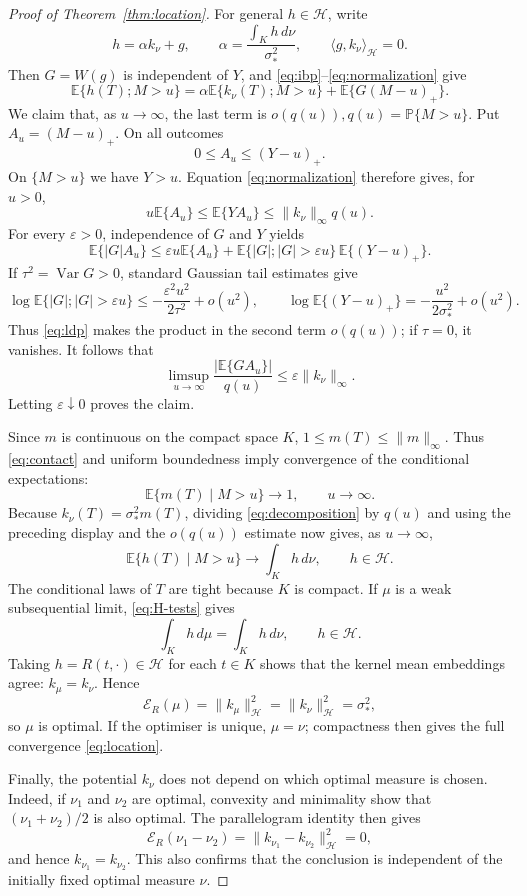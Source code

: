 \documentclass[11pt]{amsart}
\theoremstyle{definition}
\theoremstyle{remark}
\DeclareMathOperator*{\Var}{Var}
\newcommand{\Pp}{\mathbb P}
\newcommand{\Ee}{\mathbb E}
\newcommand{\cH}{\mathcal H}
\begin{document}
\begin{proof}[Proof of Theorem~\ref{thm:location}]
For general $h\in\cH$, write
\[
 h=\alpha k_\nu+g,
 \qquad
 \alpha=\frac{\int_Kh\,d\nu}{\sigma_*^2},
 \qquad
 \langle g,k_\nu\rangle_{\cH}=0.
\]
Then $G=W(g)$ is independent of $Y$, and \eqref{eq:ibp}--\eqref{eq:normalization}
give
\begin{equation}
 \Ee\{h(T);M>u\}
 =\alpha\Ee\{k_\nu(T);M>u\}+\Ee\{G(M-u)_+\}.
 \label{eq:decomposition}
\end{equation}
We claim that, as $u\to\infty$, the last term is $o(q(u)), q(u)=\Pp\{M>u\}$.  Put
$A_u=(M-u)_+$.  On all
outcomes
\[
 0\leq A_u\leq(Y-u)_+.
\]
On $\{M>u\}$ we have $Y>u$.  Equation
\eqref{eq:normalization} therefore gives, for $u>0$,
\[
 u\Ee\{A_u\}\leq\Ee\{YA_u\}
 \leq\|k_\nu\|_\infty q(u).
\]
For every $\varepsilon>0$, independence of $G$ and $Y$ yields
\[
 \Ee\{|G|A_u\}
 \leq\varepsilon u\Ee\{A_u\}
 +\Ee\{|G|;|G|>\varepsilon u\}\,\Ee\{(Y-u)_+\}.
\]
If $\tau^2=\Var G>0$, standard Gaussian tail estimates give
\[
 \log\Ee\{|G|;|G|>\varepsilon u\}
 \leq-\frac{\varepsilon^2u^2}{2\tau^2}+o(u^2),
 \qquad
 \log\Ee\{(Y-u)_+\}
 =-\frac{u^2}{2\sigma_*^2}+o(u^2).
\]
Thus \eqref{eq:ldp} makes the product in the second term $o(q(u))$; if
$\tau=0$, it vanishes.
It follows that
\[
 \limsup_{u\to\infty}
 \frac{|\Ee\{GA_u\}|}{q(u)}
 \leq\varepsilon\|k_\nu\|_\infty.
\]
Letting $\varepsilon\downarrow0$ proves the claim.

Since $m$ is continuous on the compact space $K$,
$1\leq m(T)\leq\|m\|_\infty$.  Thus \eqref{eq:contact} and uniform
boundedness imply convergence of the conditional expectations:
\[
 \Ee\{m(T)\mid M>u\}\longrightarrow1, \qquad u\to\infty.
\]
Because $k_\nu(T)=\sigma_*^2m(T)$, dividing
\eqref{eq:decomposition} by $q(u)$ and using the preceding display and
the $o(q(u))$ estimate now gives, as $u\to\infty$,
\begin{equation}
 \Ee\{h(T)\mid M>u\}\longrightarrow\int_Kh\,d\nu,
 \qquad h\in\cH.
 \label{eq:H-tests}
\end{equation}
The conditional laws of $T$ are tight because $K$ is compact.  If $\mu$
is a weak subsequential limit, \eqref{eq:H-tests} gives
\[
 \int_Kh\,d\mu=\int_Kh\,d\nu,
 \qquad h\in\cH.
\]
Taking $h=R(t,\cdot)\in\cH$ for each $t\in K$ shows that the kernel mean
embeddings agree: $k_\mu=k_\nu$.  Hence
\[
 \mathcal E_R(\mu)=\|k_\mu\|_{\cH}^2
       =\|k_\nu\|_{\cH}^2=\sigma_*^2,
\]
so $\mu$ is optimal.  If the optimiser is unique, $\mu=\nu$; compactness
then gives the full convergence \eqref{eq:location}.

Finally, the potential $k_\nu$ does not depend on which optimal measure
is chosen.  Indeed, if $\nu_1$ and $\nu_2$ are optimal, convexity and
minimality show that $(\nu_1+\nu_2)/2$ is also optimal.  The parallelogram
identity then gives
\[
 \mathcal E_R(\nu_1-\nu_2)
 =\|k_{\nu_1}-k_{\nu_2}\|_{\cH}^2=0,
\]
and hence $k_{\nu_1}=k_{\nu_2}$.  This also confirms that the conclusion
is independent of the initially fixed optimal measure $\nu$.
\end{proof}
\end{document}

